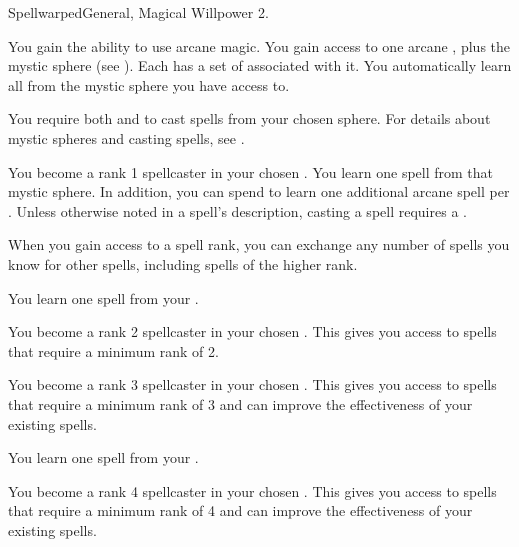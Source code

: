     \begin{magicalfeat}{Spellwarped}{General, Magical}
        \featpre Willpower 2.

         You gain the ability to use arcane magic.
        You gain access to one arcane , plus the  mystic sphere (see ).
        Each  has a set of  associated with it.
        You automatically learn all  from the mystic sphere you have access to.

        You require both  and  to cast spells from your chosen sphere.
        For details about mystic spheres and casting spells, see .

         You become a rank 1 spellcaster in your chosen .
        You learn one spell from that mystic sphere.
        In addition, you can spend  to learn one additional arcane spell per .
        Unless otherwise noted in a spell's description, casting a spell requires a .

        When you gain access to a spell rank,
            you can exchange any number of spells you know for other spells,
            including spells of the higher rank.

         You learn one spell from your .

         You become a rank 2 spellcaster in your chosen .
        This gives you access to spells that require a minimum rank of 2.

         You become a rank 3 spellcaster in your chosen .
        This gives you access to spells that require a minimum rank of 3 and can improve the effectiveness of your existing spells.

         You learn one spell from your .

         You become a rank 4 spellcaster in your chosen .
        This gives you access to spells that require a minimum rank of 4 and can improve the effectiveness of your existing spells.


\end{magicalfeat}
